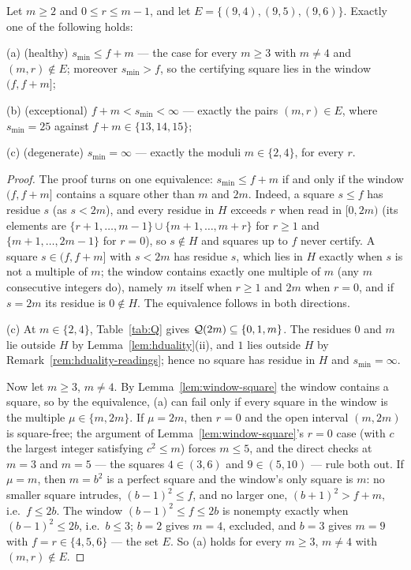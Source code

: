 \begin{proposition}\label{prop:trichotomy}
Let $m \ge 2$ and $0 \le r \le m-1$, and let
$E = \{(9,4), (9,5), (9,6)\}$. Exactly one of the following holds:

(a) (healthy) $s_{\min} \le f + m$ --- the case for every $m \ge 3$ with
$m \ne 4$ and $(m,r) \notin E$; moreover $s_{\min} > f$, so the
certifying square lies in the window $(f, f+m]$;

(b) (exceptional) $f + m < s_{\min} < \infty$ --- exactly the pairs
$(m,r) \in E$, where $s_{\min} = 25$ against $f + m \in \{13, 14, 15\}$;

(c) (degenerate) $s_{\min} = \infty$ --- exactly the moduli
$m \in \{2, 4\}$, for every $r$.
\end{proposition}
\begin{proof}
The proof turns on one equivalence: $s_{\min} \le f + m$ if and only if
the window $(f, f+m]$ contains a square other than $m$ and $2m$. Indeed,
a square $s \le f$ has residue $s$ (as $s < 2m$), and every residue in
$H$ exceeds $r$ when read in $[0, 2m)$ (its elements are
$\{r+1, \dots, m-1\} \cup \{m+1, \dots, m+r\}$ for $r \ge 1$ and
$\{m+1, \dots, 2m-1\}$ for $r = 0$), so $s \notin H$ and squares up to
$f$ never certify. A square $s \in (f, f+m]$ with $s < 2m$ has residue
$s$, which lies in $H$ exactly when $s$ is not a multiple of $m$; the
window contains exactly one multiple of $m$ (any $m$ consecutive integers
do), namely $m$ itself when $r \ge 1$ and $2m$ when $r = 0$, and if
$s = 2m$ its residue is $0 \notin H$. The equivalence follows in both
directions.

(c) At $m \in \{2, 4\}$, Table~\ref{tab:Q} gives
$\mathcal{Q}(2m) \subseteq \{0, 1, m\}$. The residues $0$ and $m$ lie outside $H$
by Lemma~\ref{lem:hduality}(ii), and $1$ lies outside $H$ by
Remark~\ref{rem:hduality-readings}; hence no square has residue in $H$
and $s_{\min} = \infty$.

Now let $m \ge 3$, $m \ne 4$. By Lemma~\ref{lem:window-square} the window
contains a square, so by the equivalence, (a) can fail only if every
square in the window is the multiple $\mu \in \{m, 2m\}$. If $\mu = 2m$,
then $r = 0$ and the open interval $(m, 2m)$ is square-free; the argument
of Lemma~\ref{lem:window-square}'s $r = 0$ case (with $c$ the largest
integer satisfying $c^2 \le m$) forces $m \le 5$, and the direct checks
at $m = 3$ and $m = 5$ --- the squares $4 \in (3, 6)$ and
$9 \in (5, 10)$ --- rule both out. If $\mu = m$, then $m = b^2$ is a
perfect square and the window's only square is $m$: no smaller square
intrudes, $(b-1)^2 \le f$, and no larger one, $(b+1)^2 > f + m$, i.e.\
$f \le 2b$. The window $(b-1)^2 \le f \le 2b$ is nonempty exactly when
$(b-1)^2 \le 2b$, i.e.\ $b \le 3$; $b = 2$ gives $m = 4$, excluded, and
$b = 3$ gives $m = 9$ with $f = r \in \{4, 5, 6\}$ --- the set $E$. So
(a) holds for every $m \ge 3$, $m \ne 4$ with $(m,r) \notin E$.


\end{proof}
